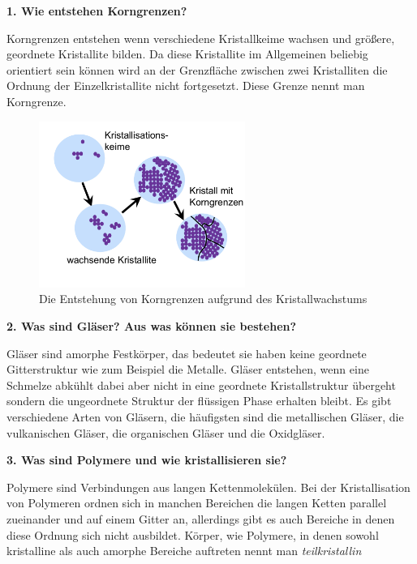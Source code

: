 \noindent\textbf{1. Wie entstehen Korngrenzen?}\\
\begin{addmargin}[25pt]{0pt}
Korngrenzen entstehen wenn verschiedene Kristallkeime wachsen und größere, geordnete Kristallite bilden. Da diese Kristallite im Allgemeinen beliebig orientiert sein können wird an der Grenzfläche zwischen zwei Kristalliten die Ordnung der Einzelkristallite nicht fortgesetzt. Diese Grenze nennt man Korngrenze.
\begin{figure}[h]
    \centering
     \includegraphics[width = 0.6\textwidth]{images/Materialwissenschaften/Korngrenzen.jpeg}
    \caption{Die Entstehung von Korngrenzen aufgrund des Kristallwachstums}
    \label{fig:Korngrenzen}
\end{figure}
\end{addmargin}

\noindent\textbf{2. Was sind Gläser? Aus was können sie bestehen?}\\
\begin{addmargin}[25pt]{0pt}
Gläser sind amorphe Festkörper, das bedeutet sie haben keine geordnete Gitterstruktur wie zum Beispiel die Metalle. Gläser entstehen, wenn eine Schmelze abkühlt dabei aber nicht in eine geordnete Kristallstruktur übergeht sondern die ungeordnete Struktur der flüssigen Phase erhalten bleibt. Es gibt verschiedene Arten von Gläsern, die häufigsten sind die metallischen Gläser, die vulkanischen Gläser, die organischen Gläser und die Oxidgläser. \\
\end{addmargin}

\noindent\textbf{3. Was sind Polymere und wie kristallisieren sie?}\\
\begin{addmargin}[25pt]{0pt}
Polymere sind Verbindungen aus langen Kettenmolekülen. Bei der Kristallisation von Polymeren ordnen sich in manchen Bereichen die langen Ketten parallel zueinander und auf einem Gitter an, allerdings gibt es auch Bereiche in denen diese Ordnung sich nicht ausbildet. Körper, wie Polymere, in denen sowohl kristalline als auch amorphe Bereiche auftreten nennt man \textit{teilkristallin}\\
\end{addmargin}

